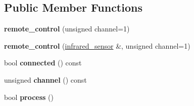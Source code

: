 \subsection*{Public Member Functions}
\begin{DoxyCompactItemize}
\item 
\mbox{\label{classev3dev_1_1remote__control_ab94bdd42f135dbc574a55549ed34fce3}} 
{\bfseries remote\+\_\+control} (unsigned channel=1)
\item 
\mbox{\label{classev3dev_1_1remote__control_a2a0ea96e119422bb642296d5ce1dac52}} 
{\bfseries remote\+\_\+control} (\hyperlink{classev3dev_1_1infrared__sensor}{infrared\+\_\+sensor} \&, unsigned channel=1)
\item 
\mbox{\label{classev3dev_1_1remote__control_ac60f44f5945b4dd333d7a73c36904597}} 
bool {\bfseries connected} () const
\item 
\mbox{\label{classev3dev_1_1remote__control_a9e966ff89ac31b1d680cf0480d87eca4}} 
unsigned {\bfseries channel} () const
\item 
\mbox{\label{classev3dev_1_1remote__control_a5f010a700a8686382cb24d22084432c2}} 
bool {\bfseries process} ()
\end{DoxyCompactItemize}
